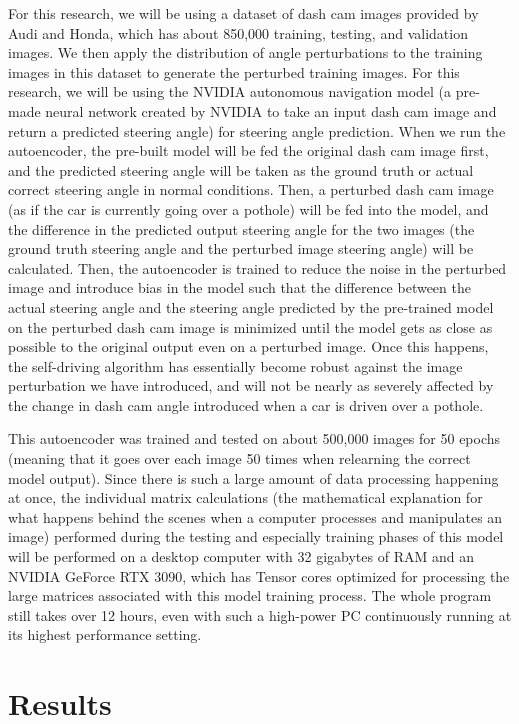 \documentclass{article}
\begin{document}
For this research, we will be using a dataset of dash cam images provided by Audi and Honda, which has about 850,000 training, testing, and validation images. We then apply the distribution of angle perturbations to the training images in this dataset to generate the perturbed training images. For this research, we will be using the NVIDIA autonomous navigation model (a pre-made neural network created by NVIDIA to take an input dash cam image and return a predicted steering angle) for steering angle prediction. When we run the autoencoder, the pre-built model will be fed the original dash cam image first, and the predicted steering angle will be taken as the ground truth or actual correct steering angle in normal conditions. Then, a perturbed dash cam image (as if the car is currently going over a pothole) will be fed into the model, and the difference in the predicted output steering angle for the two images (the ground truth steering angle and the perturbed image steering angle) will be calculated. Then, the autoencoder is trained to reduce the noise in the perturbed image and introduce bias in the model such that the difference between the actual steering angle and the steering angle predicted by the pre-trained model on the perturbed dash cam image is minimized until the model gets as close as possible to the original output even on a perturbed image. Once this happens, the self-driving algorithm has essentially become robust against the image perturbation we have introduced, and will not be nearly as severely affected by the change in dash cam angle introduced when a car is driven over a pothole.

This autoencoder was trained and tested on about 500,000 images for 50 epochs (meaning that it goes over each image 50 times when relearning the correct model output). Since there is such a large amount of data processing happening at once, the individual matrix calculations (the mathematical explanation for what happens behind the scenes when a computer processes and manipulates an image) performed during the testing and especially training phases of this model will be performed on a desktop computer with 32 gigabytes of RAM and an NVIDIA GeForce RTX 3090, which has Tensor cores optimized for processing the large matrices associated with this model training process. The whole program still takes over 12 hours, even with such a high-power PC continuously running at its highest performance setting.

\section{Results}
\end{document}
